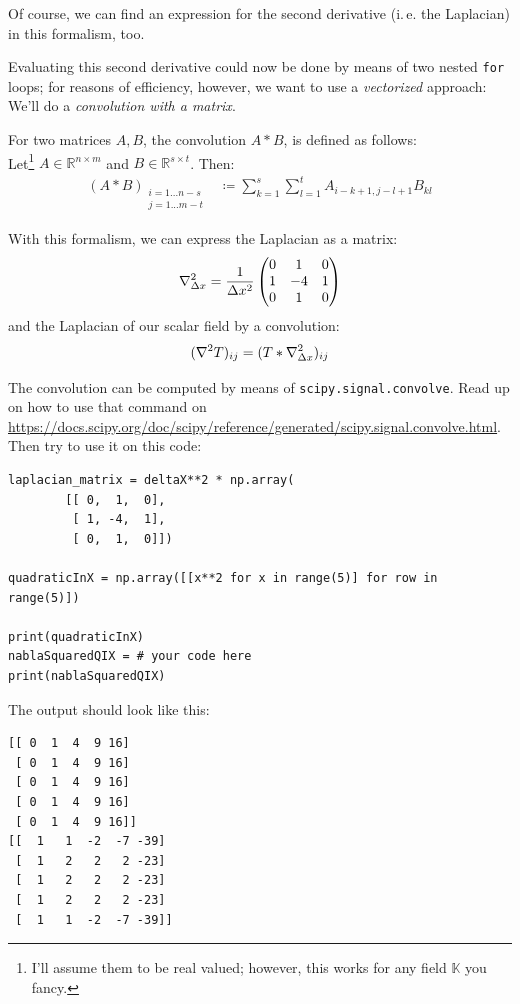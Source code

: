 \documentclass[
	english,
	fontsize=10pt,
	parskip=half,
	titlepage=true,
	DIV=12
]{scrartcl}
\newcommand*{\inPy}[1]{\texttt{#1}}
\newcommand*{\ie}{i.\,e. }
\begin{document}
Of course, we can find an expression for the second derivative (\ie the Laplacian) in this formalism, too.

Evaluating this second derivative could now be done by means of two nested \inPy{for} loops; for reasons of efficiency, however, we want to use a \emph{vectorized} approach: We'll do a \emph{convolution with a matrix}.

For two matrices $A, B$, the convolution $A \ast B$, is defined as follows:\\
Let\footnote{I'll assume them to be real valued; however, this works for any field $\mathbb{K}$ you fancy.} $A \in \mathbb{R}^{n \times m}$ and $B \in \mathbb{R}^{s \times t}$. Then:
\begin{align*}
	(A \ast B)_{\substack{
		i = 1 ... n-s\\
		j = 1 ... m-t
	}}
&\coloneqq
	\sum_{k = 1}^{s}
	\sum_{l = 1}^{t}
		A_{i-k+1, j-l+1} B_{kl}
\end{align*}

With this formalism, we can express the Laplacian as a matrix:
\[ 
	\laplacian_{\Delta x} 
= 
	\frac{1}{\Delta x^2}
	\begin{pmatrix}
		 0 &  1 &  0 \\
		 1 & -4 &  1 \\
		 0 &  1 &  0
	\end{pmatrix}
\]
and the Laplacian of our scalar field by a convolution:
\[ (\laplacian T)_{ij} = (T \ast \laplacian_{\Delta x})_{ij} \]

The convolution can be computed by means of \texttt{scipy.signal.convolve}. Read up on how to use that command on \url{https://docs.scipy.org/doc/scipy/reference/generated/scipy.signal.convolve.html}. Then try to use it on this code:
\begin{verbatim}
laplacian_matrix = deltaX**2 * np.array(
        [[ 0,  1,  0],
         [ 1, -4,  1],
         [ 0,  1,  0]])

quadraticInX = np.array([[x**2 for x in range(5)] for row in range(5)])

print(quadraticInX)
nablaSquaredQIX = # your code here
print(nablaSquaredQIX)
\end{verbatim}

The output should look like this:
\begin{verbatim}
[[ 0  1  4  9 16]
 [ 0  1  4  9 16]
 [ 0  1  4  9 16]
 [ 0  1  4  9 16]
 [ 0  1  4  9 16]]
[[  1   1  -2  -7 -39]
 [  1   2   2   2 -23]
 [  1   2   2   2 -23]
 [  1   2   2   2 -23]
 [  1   1  -2  -7 -39]]
\end{verbatim}
\end{document}
